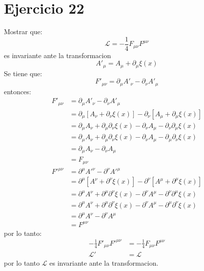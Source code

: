 \section*{Ejercicio 22}
Mostrar que:
\begin{equation*}
    \mathcal{L}=-\frac{1}{4} F_{\mu\nu}F^{\mu\nu}
\end{equation*}
es invariante ante la transformacion 
\begin{equation*}
    {A}'_\mu = A_\mu +\partial_\mu \xi(x)
\end{equation*}
Se tiene que:
\begin{equation*}
    {F}'_{\mu\nu}= \partial_\mu {A}'_\nu -\partial_\nu {A}'_\mu
\end{equation*}
entonces:
\begin{align*}
    {F}'_{\mu\nu}&= \partial_\mu {A}'_\nu -\partial_\nu {A}'_\mu\\
    &=\partial_\mu\left[A_\nu +\partial_\nu \xi(x)\right] - \partial_\nu  \left[A_\mu+\partial_\mu \xi(x)\right]\\
    &=\partial_\mu A_\nu +\partial_\mu \partial_\nu \xi(x) - \partial_\nu A_\mu -\partial_\nu \partial_\mu \xi(x)\\
    &=\partial_\mu A_\nu +\partial_\mu \partial_\nu \xi(x) - \partial_\nu A_\mu -\partial_\mu \partial_\nu \xi(x)\\
    &=\partial_\mu A_\nu - \partial_\nu A_\mu \\
    &= F_{\mu \nu}
\end{align*}
\begin{align*}
    {F}'^{\mu\nu}&= \partial^\mu {A}'^\nu -\partial^\nu {A}'^\mu\\
    &=\partial^\mu\left[A^\nu +\partial^\nu \xi(x)\right] - \partial^\nu  \left[A^\mu+\partial^\mu \xi(x)\right]\\
    &=\partial^\mu A^\nu +\partial^\mu \partial^\nu \xi(x) - \partial^\nu A^\mu -\partial^\nu \partial^\mu \xi(x)\\
    &=\partial^\mu A^\nu +\partial^\mu \partial^\nu \xi(x) - \partial^\nu A^\mu -\partial^\mu \partial^\nu \xi(x)\\
    &=\partial^\mu A^\nu - \partial^\nu A^\mu \\
    &= F^{\mu \nu}
\end{align*}
por lo tanto:
\begin{align*}
    -\frac{1}{4}{F}'_{\mu\nu}{F}'^{\mu\nu}&=-\frac{1}{4}F_{\mu \nu}F^{\mu \nu}\\
    {\mathcal{L}}' &= \mathcal{L}
\end{align*}
por lo tanto $\mathcal{L}$ es invariante ante la transformacion.